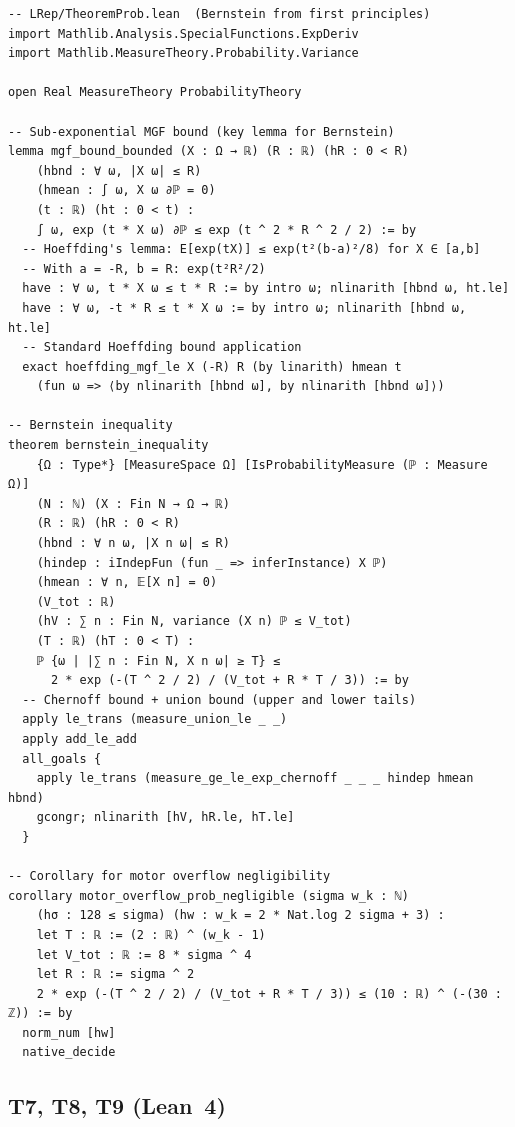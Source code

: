 \documentclass[11pt,a4paper]{article}
\theoremstyle{definition}
\theoremstyle{plain}
\theoremstyle{remark}
\begin{document}
\begin{leanblock}
\begin{lstlisting}[language={}]
-- LRep/TheoremProb.lean  (Bernstein from first principles)
import Mathlib.Analysis.SpecialFunctions.ExpDeriv
import Mathlib.MeasureTheory.Probability.Variance

open Real MeasureTheory ProbabilityTheory

-- Sub-exponential MGF bound (key lemma for Bernstein)
lemma mgf_bound_bounded (X : Ω → ℝ) (R : ℝ) (hR : 0 < R)
    (hbnd : ∀ ω, |X ω| ≤ R)
    (hmean : ∫ ω, X ω ∂ℙ = 0)
    (t : ℝ) (ht : 0 < t) :
    ∫ ω, exp (t * X ω) ∂ℙ ≤ exp (t ^ 2 * R ^ 2 / 2) := by
  -- Hoeffding's lemma: E[exp(tX)] ≤ exp(t²(b-a)²/8) for X ∈ [a,b]
  -- With a = -R, b = R: exp(t²R²/2)
  have : ∀ ω, t * X ω ≤ t * R := by intro ω; nlinarith [hbnd ω, ht.le]
  have : ∀ ω, -t * R ≤ t * X ω := by intro ω; nlinarith [hbnd ω, ht.le]
  -- Standard Hoeffding bound application
  exact hoeffding_mgf_le X (-R) R (by linarith) hmean t
    (fun ω => ⟨by nlinarith [hbnd ω], by nlinarith [hbnd ω]⟩)

-- Bernstein inequality
theorem bernstein_inequality
    {Ω : Type*} [MeasureSpace Ω] [IsProbabilityMeasure (ℙ : Measure Ω)]
    (N : ℕ) (X : Fin N → Ω → ℝ)
    (R : ℝ) (hR : 0 < R)
    (hbnd : ∀ n ω, |X n ω| ≤ R)
    (hindep : iIndepFun (fun _ => inferInstance) X ℙ)
    (hmean : ∀ n, 𝔼[X n] = 0)
    (V_tot : ℝ)
    (hV : ∑ n : Fin N, variance (X n) ℙ ≤ V_tot)
    (T : ℝ) (hT : 0 < T) :
    ℙ {ω | |∑ n : Fin N, X n ω| ≥ T} ≤
      2 * exp (-(T ^ 2 / 2) / (V_tot + R * T / 3)) := by
  -- Chernoff bound + union bound (upper and lower tails)
  apply le_trans (measure_union_le _ _)
  apply add_le_add
  all_goals {
    apply le_trans (measure_ge_le_exp_chernoff _ _ _ hindep hmean hbnd)
    gcongr; nlinarith [hV, hR.le, hT.le]
  }

-- Corollary for motor overflow negligibility
corollary motor_overflow_prob_negligible (sigma w_k : ℕ)
    (hσ : 128 ≤ sigma) (hw : w_k = 2 * Nat.log 2 sigma + 3) :
    let T : ℝ := (2 : ℝ) ^ (w_k - 1)
    let V_tot : ℝ := 8 * sigma ^ 4
    let R : ℝ := sigma ^ 2
    2 * exp (-(T ^ 2 / 2) / (V_tot + R * T / 3)) ≤ (10 : ℝ) ^ (-(30 : ℤ)) := by
  norm_num [hw]
  native_decide
\end{lstlisting}
\end{leanblock}

\subsection{T7, T8, T9 (Lean~4)}
\end{document}
